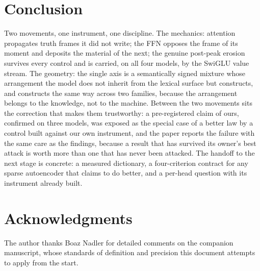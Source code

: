 \documentclass[11pt]{article}
\begin{document}
\section{Conclusion}

Two movements, one instrument, one discipline. The mechanics: attention
propagates truth frames it did not write; the FFN opposes the frame of its
moment and deposits the material of the next; the genuine post-peak erosion
survives every control and is carried, on all four models, by the SwiGLU
value stream. The geometry: the single axis is a semantically signed
mixture whose arrangement the model does not inherit from the lexical
surface but constructs, and constructs the same way across two families,
because the arrangement belongs to the knowledge, not to the machine.
Between the two movements sits the correction that makes them trustworthy:
a pre-registered claim of ours, confirmed on three models, was exposed as
the special case of a better law by a control built against our own
instrument, and the paper reports the failure with the same care as the
findings, because a result that has survived its owner's best attack is
worth more than one that has never been attacked. The handoff to the next
stage is concrete: a measured dictionary, a four-criterion contract for
any sparse autoencoder that claims to do better, and a per-head question
with its instrument already built.

\section*{Acknowledgments}

The author thanks Boaz Nadler for detailed comments on the companion
manuscript, whose standards of definition and precision this document
attempts to apply from the start.
\end{document}
